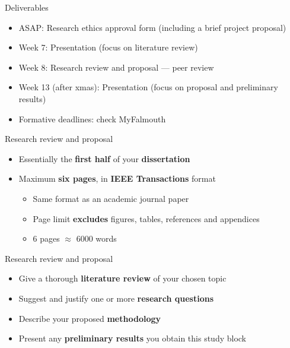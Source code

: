 \begin{frame}{Deliverables}
	\begin{itemize}
		\pause\item ASAP: Research ethics approval form (including a brief project proposal)
		\pause\item Week 7: Presentation (focus on literature review)
		\pause\item Week 8: Research review and proposal --- peer review
		\pause\item Week 13 (after xmas): Presentation (focus on proposal and preliminary results)
		\pause\item Formative deadlines: check MyFalmouth
	\end{itemize}
\end{frame}

\begin{frame}{Research review and proposal}
	\begin{itemize}
		\pause\item Essentially the \textbf{first half} of your \textbf{dissertation}
		\pause\item Maximum \textbf{six pages}, in \textbf{IEEE Transactions} format
			\begin{itemize}
				\pause\item Same format as an academic journal paper
				\pause\item Page limit \textbf{excludes} figures, tables, references and appendices
				\pause\item 6 pages $\approx$ 6000 words
			\end{itemize}
	\end{itemize}
\end{frame}

\begin{frame}{Research review and proposal}
	\begin{itemize}
		\pause\item Give a thorough \textbf{literature review} of your chosen topic
		\pause\item Suggest and justify one or more \textbf{research questions}
		\pause\item Describe your proposed \textbf{methodology}
		\pause\item Present any \textbf{preliminary results} you obtain this study block
	\end{itemize}
\end{frame}

